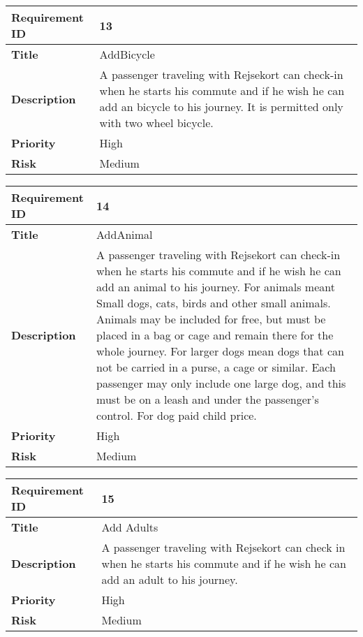 \begin{center}
	\def\arraystretch{1.5}%
    \begin{tabular}{ | p{5cm} | p{5cm} |}
    \hline
    	\textbf{Requirement ID} & 13 \\ \hline
		\textbf{Title} & AddBicycle\\ \hline
		\textbf{Description} & A passenger traveling with Rejsekort can check-in when he starts his commute and if he wish he can add an bicycle to his journey. It is permitted only with two wheel bicycle.\\ \hline
		\textbf{Priority} & High\\ \hline
		\textbf{Risk} & Medium\\
      \hline
    \end{tabular}
\end{center}

\begin{center}
	\def\arraystretch{1.5}%
    \begin{tabular}{ | p{5cm} | p{5cm} |}
    \hline
    	\textbf{Requirement ID} & 14 \\ \hline
		\textbf{Title} & AddAnimal\\ \hline
		\textbf{Description} & A passenger traveling with Rejsekort can check-in when he starts his commute and if he wish he can add an animal to his journey. For animals meant Small dogs, cats, birds and other small animals. Animals may be included for free, but must be placed in a bag or cage and remain there for the whole journey. For larger dogs mean dogs that can not be carried in a purse, a cage or similar. Each passenger may only include one large dog, and this must be on a leash and under the passenger's control. For dog paid child price.\\ \hline
		\textbf{Priority} & High\\ \hline
		\textbf{Risk} & Medium\\
      \hline
    \end{tabular}
\end{center}

\begin{center}
	\def\arraystretch{1.5}%
    \begin{tabular}{ | p{5cm} | p{5cm} |}
    \hline
    	\textbf{Requirement ID} & 15 \\ \hline
		\textbf{Title} & Add Adults\\ \hline
		\textbf{Description} & A passenger traveling with Rejsekort can check in when he starts his commute and if he wish he can add an adult to his journey.\\ \hline
		\textbf{Priority} & High\\ \hline
		\textbf{Risk} & Medium\\
      \hline
    \end{tabular}
\end{center}


